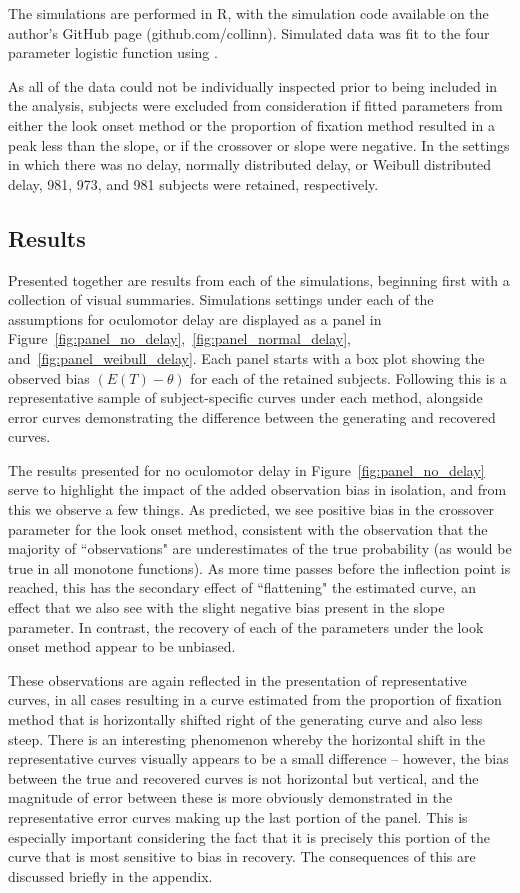 The simulations are performed in R, with the simulation code available on the author's GitHub page (github.com/collinn). Simulated data was fit to the four parameter logistic function using .

As all of the data could not be individually inspected prior to being included in the analysis, subjects were excluded from consideration if fitted parameters from either the look onset method or the proportion of fixation method resulted in a peak less than the slope, or if the crossover or slope were negative. In the settings in which there was no delay, normally distributed delay, or Weibull distributed delay, 981, 973, and 981 subjects were retained, respectively.


\subsection{Results}

Presented together are results from each of the simulations, beginning first with a collection of visual summaries. Simulations settings under each of the assumptions for oculomotor delay are displayed as a panel in Figure~\ref{fig:panel_no_delay},~\ref{fig:panel_normal_delay}, and~\ref{fig:panel_weibull_delay}. Each panel starts with a box plot showing the observed bias $(E(T) - \theta)$ for each of the retained subjects. Following this is a representative sample of subject-specific curves under each method, alongside error curves demonstrating the difference between the generating and recovered curves. 

The results presented for no oculomotor delay in Figure~\ref{fig:panel_no_delay} serve to highlight the impact of the added observation bias in isolation, and from this we observe a few things. As predicted, we see positive bias in the crossover parameter for the look onset method, consistent with the observation that the majority of ``observations" are underestimates of the true probability (as would be true in all monotone functions). As more time passes before the inflection point is reached, this has the secondary effect of ``flattening" the estimated curve, an effect that we also see with the slight negative bias present in the slope parameter. In contrast, the recovery of each of the parameters under the look onset method appear to be unbiased.

These observations are again reflected in the presentation of representative curves, in all cases resulting in a curve estimated from the proportion of fixation method that is horizontally shifted right of the generating curve and also less steep. There is an interesting phenomenon whereby the horizontal shift in the representative curves visually appears to be a small difference -- however, the bias between the true and recovered curves is not horizontal but vertical, and the magnitude of error between these is more obviously demonstrated in the representative error curves making up the last portion of the panel. This is especially important considering the fact that it is precisely this portion of the curve that is most sensitive to bias in recovery. The consequences of this are discussed briefly in the appendix. 

